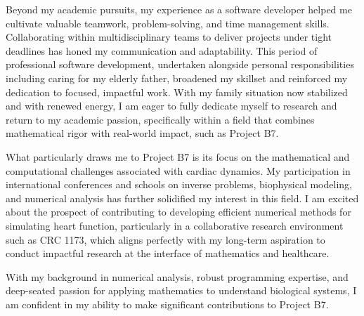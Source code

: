 \begin{newlfm}
		Beyond my academic pursuits, my experience as a software developer helped me cultivate valuable teamwork, problem-solving, and time management skills.  Collaborating within multidisciplinary teams to deliver projects under tight deadlines has honed my communication and adaptability. This period of professional software development, undertaken alongside personal responsibilities including caring for my elderly father, broadened my skillset and reinforced my dedication to focused, impactful work.  With my family situation now stabilized and with renewed energy, I am eager to fully dedicate myself to research and return to my academic passion, specifically within a field that combines mathematical rigor with real-world impact, such as Project B7.
		
		
		
		What particularly draws me to Project B7 is its focus on the mathematical and computational challenges associated with cardiac dynamics. My participation in international conferences and schools on inverse problems, biophysical modeling, and numerical analysis has further solidified my interest in this field. I am excited about the prospect of contributing to developing efficient numerical methods for simulating heart function, particularly in a collaborative research environment such as CRC 1173, which aligns perfectly with my long-term aspiration to conduct impactful research at the interface of mathematics and healthcare.
		
		With my background in numerical analysis, robust programming expertise, and deep-seated passion for applying mathematics to understand biological systems, I am confident in my ability to make significant contributions to Project B7. 
		

\end{newlfm}
